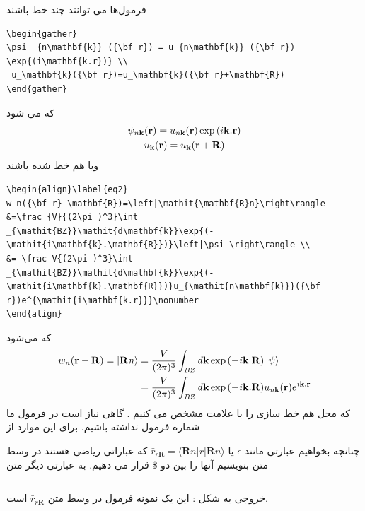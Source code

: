  فرمول‌ها می توانند چند خط باشند 
 \begin{latin}
\begin{lstlisting}[style=Tex]
 \begin{gather}
\psi _{n\mathbf{k}} ({\bf r}) = u_{n\mathbf{k}} ({\bf r})  \exp{(i\mathbf{k.r})} \\
 u_\mathbf{k}({\bf r})=u_\mathbf{k}({\bf r}+\mathbf{R})
\end{gather}
\end{lstlisting}
\end{latin}
که می شود
 \begin{gather}
\psi _{n\mathbf{k}} ({\bf r}) = u_{n\mathbf{k}} ({\bf r})  \exp{(i\mathbf{k.r})} \\
 u_\mathbf{k}({\bf r})=u_\mathbf{k}({\bf r}+\mathbf{R})
\end{gather}
ویا هم خط شده باشند
 \begin{latin}
\begin{lstlisting}[style=Tex]
\begin{align}\label{eq2}
w_n({\bf r}-\mathbf{R})=\left|\mathit{\mathbf{R}n}\right\rangle &=\frac {V}{(2\pi )^3}\int 
_{\mathit{BZ}}\mathit{d\mathbf{k}}\exp{(-\mathit{i\mathbf{k}.\mathbf{R}})}\left|\psi \right\rangle \\ 
&= \frac V{(2\pi )^3}\int 
_{\mathit{BZ}}\mathit{d\mathbf{k}}\exp{(-\mathit{i\mathbf{k}.\mathbf{R}})}u_{\mathit{n\mathbf{k}}}({\bf r})e^{\mathit{i\mathbf{k.r}}}\nonumber
\end{align}
\end{lstlisting}
\end{latin}
که می‌شود
\begin{align}\label{eq2}
w_n({\bf r}-\mathbf{R})=\left|\mathit{\mathbf{R}n}\right\rangle &=\frac {V}{(2\pi )^3}\int 
_{\mathit{BZ}}\mathit{d\mathbf{k}}\exp{(-\mathit{i\mathbf{k}.\mathbf{R}})}\left|\psi \right\rangle \\ 
&= \frac V{(2\pi )^3}\int 
_{\mathit{BZ}}\mathit{d\mathbf{k}}\exp{(-\mathit{i\mathbf{k}.\mathbf{R}})}u_{\mathit{n\mathbf{k}}}({\bf r})e^{\mathit{i\mathbf{k.r}}}\nonumber
\end{align}
که محل هم خط سازی را با علامت \lr{\&} مشخص می کنیم . گاهی نیاز است در فرمول ما شماره فرمول نداشته باشیم. برای این موارد از 

چنانچه بخواهیم عبارتی مانند $\epsilon$  یا  $ \bar{r}_{r\mathbf{R}}=\langle{\mathbf{R}n}|r|\mathbf{R}n\rangle$ که عباراتی ریاضی هستند در وسط متن بنویسیم آنها را  بین دو \$ قرار می دهیم. به عبارتی دیگر متن 
 \begin{latin}
\begin{lstlisting}[style=Tex]
 %*\rl{است }*) $ \bar{r}_{r\mathbf{R}}$   %*\rl{ این یک نمونه فرمول در وسط  متن }*)
\end{lstlisting}
\end{latin}
خروجی به شکل :
  این یک نمونه فرمول در وسط  متن  $ \bar{r}_{r\mathbf{R}}$ است.
  
